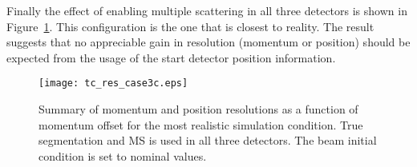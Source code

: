 \documentclass[20]{article}
\begin{document}
Finally the effect of enabling multiple scattering in all three
detectors is shown in Figure~\ref{step3c:res}. This configuration is
the one that is closest to reality. The result suggests that no
appreciable gain in resolution (momentum or position) should be
expected from the usage of the start detector position information.

\begin{figure}[tbp]
  \texttt{[image: tc\_res\_case3c.eps]}
  \caption{Summary of momentum and position resolutions as a function
    of momentum offset for the most realistic simulation
    condition. True segmentation and MS is used in all three
    detectors. The beam initial condition is set to nominal values. }
  \label {step3c:res}
\end{figure}
\end{document}
